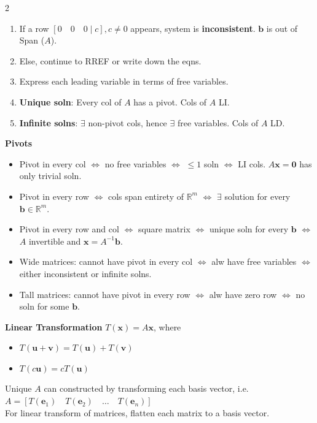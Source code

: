 \documentclass[10pt]{article}
\begin{document}
\begin{multicols*}{2}
\begin{enumerate}
    \item If a row $[0 \quad 0 \quad 0 \mid c], c \neq 0$ appears, system is \textbf{inconsistent}. $\mathbf{b}$ is out of Span ($A$).
    \item Else, continue to RREF or write down the eqns.
    \item Express each leading variable in terms of free variables.
    \item \textbf{Unique soln}: Every col of $A$ has a pivot. Cols of $A$ LI.
    \item \textbf{Infinite solns}: $\exists$ non-pivot cols, hence $\exists$ free variables. Cols of $A$ LD.
\end{enumerate}
\textbf{Pivots}
\begin{itemize}
    \item Pivot in every col $\Leftrightarrow$ no free variables $\Leftrightarrow$ $\leq 1$ soln $\Leftrightarrow$ LI cols. $A\mathbf{x}=\mathbf{0}$ has only trivial soln.
    \item Pivot in every row $\Leftrightarrow$ cols span entirety of $\mathbb{R}^m$ $\Leftrightarrow$ $\exists$ solution for every $\mathbf{b} \in \mathbb{R}^m$.
    \item Pivot in every row and col $\Leftrightarrow$ square matrix $\Leftrightarrow$ unique soln for every $\mathbf{b}$ $\Leftrightarrow$ $A$ invertible and $\mathbf{x} = A^{-1}\mathbf{b}$.
    \item Wide matrices: cannot have pivot in every col $\Leftrightarrow$ alw have free variables $\Leftrightarrow$ either inconsistent or infinite solns.
    \item Tall matrices: cannot have pivot in every row $\Leftrightarrow$ alw have zero row $\Leftrightarrow$ no soln for some $\mathbf{b}$.
\end{itemize}
\textbf{Linear Transformation} $T(\mathbf{x}) = A\mathbf{x}$, where
\begin{itemize}
    \item $T(\mathbf{u} + \mathbf{v}) = T(\mathbf{u}) + T(\mathbf{v})$
    \item $T(c\mathbf{u}) = cT(\mathbf{u})$
\end{itemize}
Unique $A$ can constructed by transforming each basis vector, i.e. $A = [T(\mathbf{e}_1) \quad T(\mathbf{e}_2) \quad \dots \quad T(\mathbf{e}_n)]$\\
For linear transform of matrices, flatten each matrix to a basis vector.


\end{multicols*}
\end{document}
